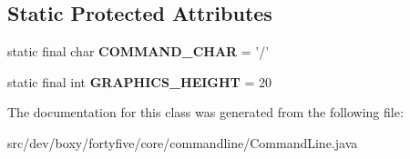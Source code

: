\subsection*{Static Protected Attributes}
\begin{DoxyCompactItemize}
\item 
\hypertarget{classdev_1_1boxy_1_1fortyfive_1_1core_1_1commandline_1_1_command_line_a7e12d8a2bd9364b64a0cd24f97a58a4d}{
static final char {\bfseries COMMAND\_\-CHAR} = '/'}
\label{d6/dfd/classdev_1_1boxy_1_1fortyfive_1_1core_1_1commandline_1_1_command_line_a7e12d8a2bd9364b64a0cd24f97a58a4d}

\item 
\hypertarget{classdev_1_1boxy_1_1fortyfive_1_1core_1_1commandline_1_1_command_line_a02b1e96c5b3f5a473adf32b51f67f7c3}{
static final int {\bfseries GRAPHICS\_\-HEIGHT} = 20}
\label{d6/dfd/classdev_1_1boxy_1_1fortyfive_1_1core_1_1commandline_1_1_command_line_a02b1e96c5b3f5a473adf32b51f67f7c3}

\end{DoxyCompactItemize}


The documentation for this class was generated from the following file:\begin{DoxyCompactItemize}
\item 
src/dev/boxy/fortyfive/core/commandline/CommandLine.java\end{DoxyCompactItemize}

